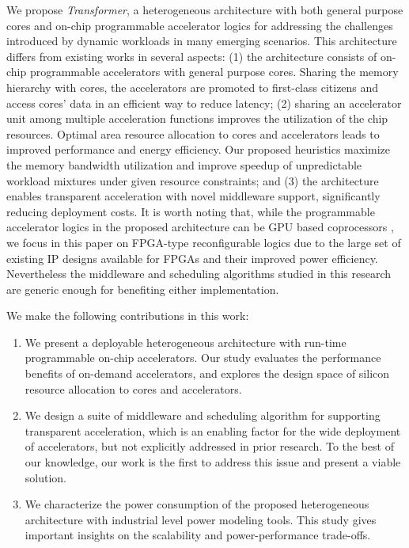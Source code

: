 We propose {\em Transformer}, a heterogeneous architecture with both
general purpose cores and on-chip programmable accelerator logics for
addressing the challenges introduced by dynamic workloads in many
emerging scenarios. This architecture differs from existing works in
several aspects: (1) the architecture consists of on-chip programmable
accelerators with general purpose cores.  Sharing the memory hierarchy
with cores, the accelerators are promoted to first-class citizens and
access cores' data in an efficient way to reduce latency;  
(2) sharing an accelerator unit among multiple acceleration functions
improves the utilization of the chip resources. Optimal area resource
allocation to cores and accelerators leads to improved performance and
energy efficiency. Our proposed heuristics maximize the memory
bandwidth utilization and improve speedup of unpredictable workload
mixtures under given resource constraints; and (3) the architecture
enables transparent acceleration with novel middleware support,
significantly reducing deployment costs.  It is worth noting that,
while the programmable accelerator logics in the proposed architecture
can be GPU based coprocessors \cite{intel-gpu}, we focus in this paper
on FPGA-type reconfigurable logics due to the large set of existing IP
designs available for FPGAs and their improved power
efficiency. Nevertheless the middleware and scheduling algorithms
studied in this research are generic enough for benefiting either
implementation.

We make the following contributions in this work:
\begin{enumerate}

\item We present a deployable heterogeneous architecture with run-time
  programmable on-chip accelerators. Our study evaluates the
  performance benefits of on-demand accelerators, and explores the
  design space of silicon resource allocation to cores and
  accelerators.

\item We design a suite of middleware and scheduling algorithm for
  supporting transparent acceleration, which is an enabling factor for
  the wide deployment of accelerators, but not explicitly addressed in
  prior research. To the best of our knowledge, our work is the first
  to address this issue and present a viable solution.

\item We characterize the power consumption of the proposed
  heterogeneous architecture with industrial level power modeling
  tools. This study gives important insights on the scalability and
  power-performance trade-offs.

\end{enumerate}

